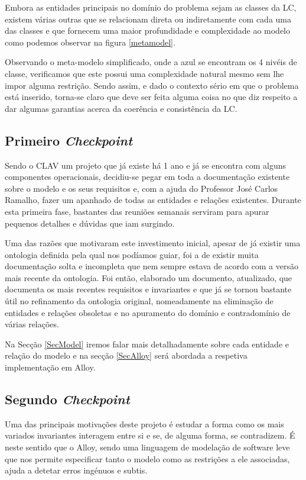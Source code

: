 \documentclass[tikz,runningheads,a4paper]{llncs}
\begin{document}
Embora as entidades principais no domínio do problema sejam as classes da LC, existem várias outras que se relacionam direta ou indiretamente com cada uma das classes e que fornecem uma maior profundidade e complexidade ao modelo como podemos observar na figura \ref{metamodel}.

Observando o meta-modelo simplificado, onde a azul se encontram os 4 nivéis de classe, verificamos que este possui uma complexidade natural mesmo sem lhe impor alguma restrição. Sendo assim, e dado o contexto sério em que o problema está inserido, torna-se claro que deve ser feita alguma coisa no que diz respeito a dar algumas garantias acerca da coerência e consistência da LC.

\subsection{Primeiro \textit{Checkpoint}}

Sendo o CLAV um projeto que já existe há 1 ano e já se encontra com alguns componentes operacionais, decidiu-se pegar em toda a documentação existente sobre o modelo e os seus requisitos e, com a ajuda do Professor José Carlos Ramalho, fazer um apanhado de todas as entidades e relações existentes. Durante esta primeira fase, bastantes das reuniões semanais serviram para apurar pequenos detalhes e dúvidas que iam surgindo.

Uma das razões que motivaram este investimento inicial, apesar de já existir uma ontologia definida pela qual nos podíamos guiar, foi a de existir muita documentação\cite{clav-new}\cite{clav-mod}\cite{clav-req} solta e incompleta que nem sempre estava de acordo com a versão mais recente da ontologia. Foi então, elaborado um documento, atualizado, que documenta os mais recentes requisitos e invariantes e que já se tornou bastante útil no refinamento da ontologia original, nomeadamente na eliminação de entidades e relações obsoletas e no apuramento do domínio e contradomínio de várias relações.

Na Secção \ref{SecModel} iremos falar mais detalhadamente sobre cada entidade e relação do modelo e na secção \ref{SecAlloy} será abordada a respetiva implementação em Alloy.

\subsection{Segundo \textit{Checkpoint}} \label{Sec2CheckP}

Uma das principais motivações deste projeto é estudar a forma como os mais variados invariantes interagem entre si e se, de alguma forma, se contradizem. É neste sentido que o Alloy, sendo uma linguagem de modelação de software leve que nos permite especificar tanto o modelo como as restrições a ele associadas, ajuda a detetar erros ingénuos e subtis.
\end{document}
